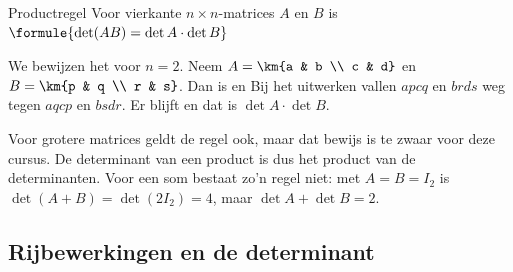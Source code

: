 \begin{theorie}
\begin{stelling}{Productregel}
Voor vierkante $n \times n$-matrices $A$ en $B$ is \qquad $\formule{\det(AB) = \det A \cdot \det B}$
\end{stelling}

\begin{bewijs}
We bewijzen het voor $n = 2$. Neem $A = \km{a & b \\ c & d}$ en $B = \km{p & q \\ r & s}$. Dan is
en
Bij het uitwerken vallen $apcq$ en $brds$ weg tegen $aqcp$ en $bsdr$. Er blijft
en dat is $\det A \cdot \det B$.
\end{bewijs}
\end{theorie}

Voor grotere matrices geldt de regel ook, maar dat bewijs is te zwaar voor deze cursus. De determinant van een product is dus het product van de determinanten. Voor een som bestaat zo'n regel niet: met $A = B = I_2$ is $\det(A + B) = \det(2I_2) = 4$, maar $\det A + \det B = 2$.


\begin{oefeningen}
\end{oefeningen}

\subsection{Rijbewerkingen en de determinant}

